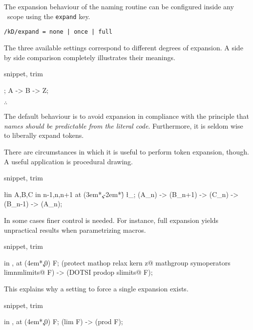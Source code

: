 The expansion behaviour of the naming routine can be configured
inside any \koDi\ scope using the \lstinline!expand! key.

\begin{lstlisting}
/kD/expand = none | once | full
\end{lstlisting}

The three available settings correspond to different degrees of expansion.
A side by side comparison completely illustrates their meanings.

\begin{tcblisting}{snippet, trim}
\begin{kodi}
\def\B{Z}
\def\A{\B}
\obj{ |[expand=none]| \A &     %
      |[expand=once]| \A &     %
      |[expand=full]| \A \\ }; %
\mor A -> B -> Z;
\end{kodi}
\end{tcblisting}

\hfill$\therefore$\hfill\null

The default behaviour is to avoid expansion in compliance with the principle
that \emph{names should be predictable from the \emph{literal} code}.
Furthermore, it is seldom wise to liberally expand tokens.

There are circumstances in which it is useful to perform token expansion,
though. A useful application is procedural drawing.

\begin{tcblisting}{snippet, trim}
\begin{kodi}
\foreach [count=\r] \l in {A,B,C}
  \foreach [count=\c] \n in {n-1,n,n+1}
    \obj [expand=full] at (3em*\c,-2em*\r) {\l_{\n}};
\mor (A_{n}) -> (B_{n+1}) -> (C_{n}) -> (B_{n-1}) -> (A_{n});
\end{kodi}
\end{tcblisting}

In some cases finer control is needed. For instance, full expansion
yields unpractical results when parametrizing macros.

\begin{tcblisting}{snippet, trim}
\begin{kodi}
\foreach [count=\c] \m in {\lim,\prod}
  \obj [expand=full] at (4em*\c,0) {\m F};
\mor (protect mathop {relax kern z@ mathgroup
                        symoperators lim}nmlimits@ F)
  -> (DOTSI prodop slimits@ F);
\end{kodi}
\end{tcblisting}

This explains why a setting to force a single expansion exists.

\begin{tcblisting}{snippet, trim}
\begin{kodi}
\foreach [count=\c] \m in {\lim,\prod}
  \obj [expand=once] at (4em*\c,0) {\m F};
\mor (lim F) -> (prod F);
\end{kodi}
\end{tcblisting}
